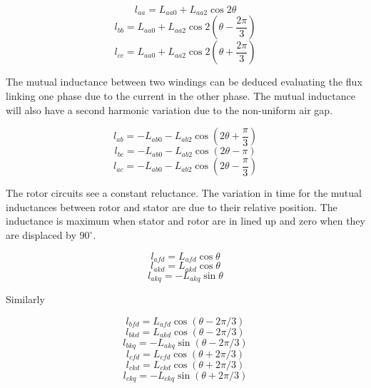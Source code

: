 \begin{equation} \label{eq:SelfInductanceA}
	l_{aa} = L_{aa0} + L_{aa2} \cos 2 \theta
\end{equation}
\begin{equation} \label{eq:SelfInductanceA}
	l_{bb} = L_{aa0} + L_{aa2} \cos 2 (\theta - \frac{2 \pi}{3})
\end{equation}
\begin{equation} \label{eq:SelfInductanceA}
	l_{cc} = L_{aa0} + L_{aa2} \cos 2 (\theta + \frac{2 \pi}{3})
\end{equation}

The mutual inductance between two windings can be deduced evaluating the flux linking one phase due to the current in the other phase. The mutual inductance will also have a second harmonic variation due to the non-uniform air gap.

\begin{equation} \label{eq:SelfInductanceA}
	l_{ab} = -L_{ab0} - L_{ab2} \cos (2 \theta + \frac{\pi}{3})
\end{equation}
\begin{equation} \label{eq:SelfInductanceA}
	l_{bc} = -L_{ab0} - L_{ab2} \cos (2 \theta - \pi)
\end{equation}
\begin{equation} \label{eq:SelfInductanceA}
	l_{ac} = - L_{ab0} - L_{ab2} \cos (2 \theta - \frac{\pi}{3})
\end{equation}

The rotor circuits see a constant reluctance. The variation in time for the mutual inductances between rotor and stator are due to their relative position. The inductance is maximum when stator and rotor are in lined up and zero when they are displaced by $90^{\circ}$.

\begin{equation}
	l_{afd} = L_{afd} \cos \theta
\end{equation}
\begin{equation}
	l_{akd} = L_{akd} \cos \theta
\end{equation}
\begin{equation}
	l_{akq} = -L_{akq} \sin \theta
\end{equation}

Similarly 

\begin{equation}
	l_{bfd} = L_{afd} \cos (\theta - 2 \pi / 3)
\end{equation}
\begin{equation}
	l_{bkd} = L_{akd} \cos (\theta - 2 \pi / 3)
\end{equation}
\begin{equation}
	l_{bkq} = -L_{akq} \sin (\theta - 2 \pi / 3)
\end{equation}
\begin{equation}
	l_{cfd} = L_{cfd} \cos (\theta + 2 \pi / 3)
\end{equation}
\begin{equation}
	l_{ckd} = L_{ckd} \cos (\theta + 2 \pi / 3)
\end{equation}
\begin{equation}
	l_{ckq} = -L_{ckq} \sin (\theta + 2 \pi / 3)
\end{equation}

